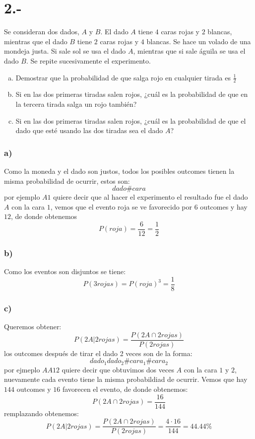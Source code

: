 \documentclass{article}
\begin{document}
\section*{2.-}
Se consideran dos dados, $A$ y $B$. El dado $A$ tiene $4$ caras rojas y $2$ blancas, mientras que el dado 
$B$ tiene $2$ caras rojas y $4$ blancas. Se hace un volado de una mondeja justa. 
Si sale sol se usa el dado $A$, mientras que si sale águila se usa el dado $B$. Se repite sucesivamente el experimento.
\begin{enumerate}[a)]
    \item Demostrar que la probabilidad de que salga rojo en cualquier tirada es $\frac{1}{2}$
    \item Si en las dos primeras tiradas salen rojos, ¿cuál es la probabilidad de que en la tercera tirada salga un rojo también?
    \item Si en las dos primeras tiradas salen rojos, ¿cuál es la probabilidad de que el dado que esté usando las dos tiradas sea el dado $A$?
\end{enumerate}
\begin{tcolorbox}[breakable]
    \subsubsection*{a)}
    Como la moneda y el dado son justos, todos los posibles outcomes tienen la misma probabilidad de ocurrir, estos son:
    \[ dado\#cara \]
    por ejemplo $A1$ quiere decir que al hacer el experimento el resultado fue el dado $A$ con la cara $1$, 
    vemos que el evento roja se ve favorecido por $6$ outcomes y hay $12$, de donde obtenemos 
    \[P(roja) = \frac{6}{12} = \frac{1}{2} \]
    \subsubsection*{b)}
    Como los eventos son disjuntos se tiene:
    \[ P(3rojas) = P(roja)^3 = \frac{1}{8} \]
    \subsubsection*{c)}
    Queremos obtener:
    \[ P(2A|2rojas) = \frac{P(2A \cap 2rojas)}{P(2rojas)} \]
    los outcomes después de tirar el dado 2 veces son de la forma:
    \[ dado_1dado_2\#cara_1\#cara_2 \]
    por ejmeplo $AA12$ quiere decir que obtuvimos dos veces $A$ con la cara $1$ y $2$,
    nuevamente cada evento tiene la misma probabildiad de ocurrir. Vemos que hay $144$ outcomes 
    y $16$ favorecen el evento, de donde obtenemos:
    \[ P(2A \cap 2rojas) = \frac{16}{144} \]
    remplazando obtenemos:
    \[ P(2A|2rojas) = \frac{P(2A \cap 2rojas)}{P(2rojas)} = \frac{4 \cdot 16}{144} = 44.44\% \]

\end{tcolorbox}
\end{document}
